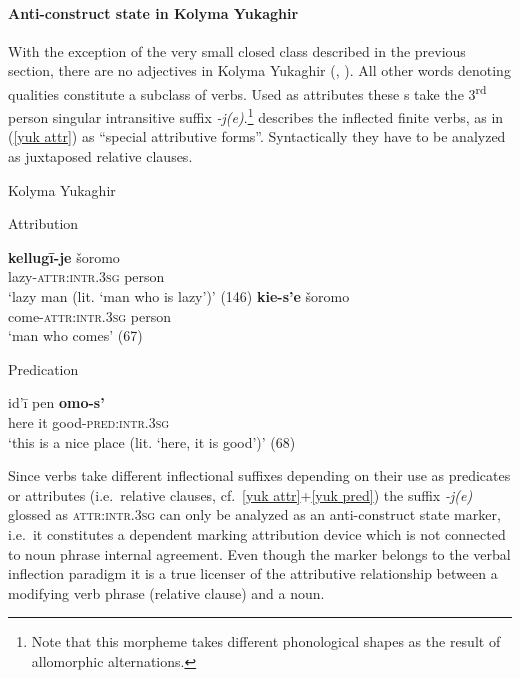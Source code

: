 \paragraph*{Anti\hyp{}construct state in Kolyma Yukaghir}
With the exception of the very small closed class described in the previous section, there are no adjectives in Kolyma Yukaghir (\citealt[79–112]{krejnovic1982}, \citealt[66–69, 145–147]{maslova2003b}). All other words denoting qualities constitute a subclass of verbs. Used as attributes these s take the 3\textsuperscript{rd} person singular intransitive suffix \mbox{\textit{-j(e)}}.\footnote{Note that this morpheme takes different phonological shapes as the result of allomorphic alternations.} \citet[66, elsewhere]{maslova2003b} describes the inflected finite verbs, as in (\ref{yuk attr}) as “special attributive forms”. Syntactically they have to be analyzed as juxtaposed relative clauses.
\begin{exe}
\ex 	
\rm{Kolyma Yukaghir \citep{maslova2003b}}
\begin{xlist}
\ex 
\label{yuk attr}
\rm{Attribution}
\begin{xlist}
\ex
\gll 	\textbf{kellugī-je} šoromo\\
	lazy-\textsc{attr:intr.3sg} person\\
\glt	‘lazy man (lit. ‘man who is lazy’)’ (146)
\ex
\gll	\textbf{kie-s'e} šoromo\\
	come-\textsc{attr:intr.3sg} person\\
\glt	‘man who comes’ (67)
\end{xlist}

\ex 
\label{yuk pred} 
\rm{Predication}
\begin{xlist}
\ex
\gll 	id'ī pen \textbf{omo-s'}\\
	here it good-\textsc{pred:intr.3sg}\\
\glt	‘this is a nice place (lit. ‘here, it is good’)’ (68)
\end{xlist}
\end{xlist}
\end{exe}
Since verbs take different inflectional suffixes depending on their use as predicates or attributes (i.e.~relative clauses, cf.~\ref{yuk attr}+\ref{yuk pred}) the suffix \textit{-j(e)} glossed as \textsc{attr:intr.3sg} can only be analyzed as an anti\hyp{}construct state marker, i.e.~it constitutes a dependent marking attribution device which is not connected to noun phrase internal agreement. Even though the marker belongs to the verbal inflection paradigm it is a true licenser of the attributive relationship between a modifying verb phrase (relative clause) and a noun.

